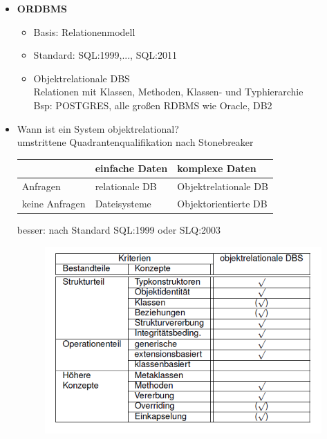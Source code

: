 \begin{itemize}
	\item \textbf{ORDBMS}
	\begin{itemize}
		\item Basis: Relationenmodell
		\item Standard: SQL:1999,..., SQL:2011
		\item Objektrelationale DBS\\
		Relationen mit Klassen, Methoden, Klassen- und Typhierarchie\\
		Bsp: POSTGRES, alle großen RDBMS wie Oracle, DB2
	\end{itemize}
	
	\item Wann ist ein System objektrelational?\\
	umstrittene Quadrantenqualifikation nach Stonebreaker
	\begin{table}[!h]
		\centering
		\begin{tabular}{|l||l|l|}
			\hline
			& einfache Daten & komplexe Daten\\
			\hline
			\hline
			Anfragen	& relationale DB	& Objektrelationale DB\\
			\hline
			keine Anfragen	& Dateisysteme & Objektorientierte DB\\
			\hline
		\end{tabular}
	\end{table}
	besser: nach Standard SQL:1999 oder SLQ:2003
	\begin{figure}[!h]
		\centering
		\includegraphics[scale=0.5]{img/objektrelational.png}
	\end{figure}
	

\end{itemize}
